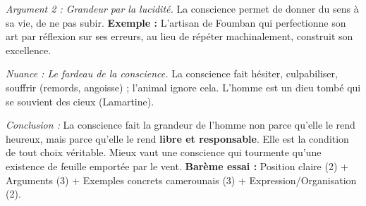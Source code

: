 \documentclass[11pt]{article}
\begin{document}
\begin{exoresolu}
\textit{Argument 2 : Grandeur par la lucidité.} La conscience permet de donner du sens à sa vie, de ne pas subir. \textbf{Exemple :} L'artisan de Foumban qui perfectionne son art par réflexion sur ses erreurs, au lieu de répéter machinalement, construit son excellence.

\textit{Nuance : Le fardeau de la conscience.} La conscience fait hésiter, culpabiliser, souffrir (remords, angoisse) ; l'animal ignore cela. \og L'homme est un dieu tombé qui se souvient des cieux \fg (Lamartine).

\textit{Conclusion :} La conscience fait la grandeur de l'homme non parce qu'elle le rend heureux, mais parce qu'elle le rend \textbf{libre et responsable}. Elle est la condition de tout choix véritable. Mieux vaut une conscience qui tourmente qu'une existence de feuille emportée par le vent.
\textbf{Barème essai :} Position claire (2) + Arguments (3) + Exemples concrets camerounais (3) + Expression/Organisation (2).
\end{exoresolu}
\end{document}
